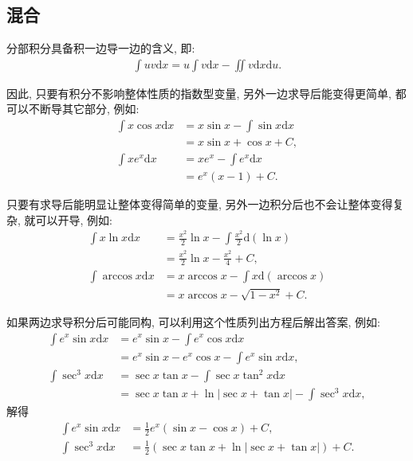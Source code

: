 \documentclass[UTF8,a4paper,11pt]{ctexart}
\begin{document}
    \subsection{混合}
      分部积分具备积一边导一边的含义, 即:
      \[
      \begin{aligned}
        \int uv \mathrm{d}x=u \int v \mathrm{d}x-\iint v \mathrm{d}x \mathrm{d}u.
      \end{aligned}
      \]
      
      因此, 只要有积分不影响整体性质的指数型变量,
      另外一边求导后能变得更简单, 
      都可以不断导其它部分, 例如:
      \[
      \begin{aligned}
        \int x \cos x \mathrm{d}x&=x \sin x-\int \sin x \mathrm{d}x
        \\&=x \sin x+\cos x+C,\\
        \int x e^{x}\mathrm{d}x&=xe^{x}-\int e^{x}\mathrm{d}x
        \\&=e^{x}\left(x-1\right)+C.
      \end{aligned}
      \]
      
      只要有求导后能明显让整体变得简单的变量,
      另外一边积分后也不会让整体变得复杂,
      就可以开导, 例如:
      \[
      \begin{aligned}
        \int x \ln x \mathrm{d}x&=\frac{x^{2}}{2}\ln x-\int \frac{x^{2}}{2}\mathrm{d}\left(\ln x\right)
        \\&=\frac{x^{2}}{2}\ln x-\frac{x^{2}}{4}+C,\\
        \int \arccos x \mathrm{d}x&=x \arccos x-\int x \mathrm{d}\left(\arccos x\right)
        \\&=x \arccos x-\sqrt{1-x^{2}}+C.
      \end{aligned}
      \]

      如果两边求导积分后可能同构,
      可以利用这个性质列出方程后解出答案, 例如:
      \[
      \begin{aligned}
        \int e^{x}\sin x \mathrm{d}x&=e^{x}\sin x-\int e^{x}\cos x \mathrm{d}x
        \\&=e^{x}\sin x-e^{x}\cos x-\int e^{x}\sin x \mathrm{d}x,\\
        \int \sec ^{3}x \mathrm{d}x&=\sec x \tan x-\int \sec x \tan ^{2}x \mathrm{d}x
        \\&=\sec x \tan x+\ln \left| \sec x+\tan x \right|-\int \sec ^{3}x \mathrm{d}x,
      \end{aligned}
      \]
      解得
      \[
      \begin{aligned}
        \int e^{x}\sin x \mathrm{d}x&=\frac{1}{2}e^{x}\left(\sin x-\cos x\right)+C,\\
        \int \sec ^{3}x \mathrm{d}x&=\frac{1}{2}\left(\sec x \tan x+\ln \left| \sec x + \tan x \right|\right)+C.
      \end{aligned}
      \]
      
\end{document}
